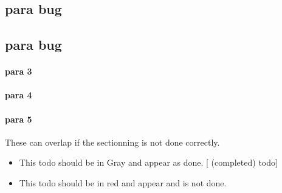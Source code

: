 \subsection{para bug}
\label{autosec:5}
\vspace{-36pt}\hspace{11pt}
\subsection{para bug}
\label{autosec:6}
\vspace{-36pt}\hspace{11pt}
\paragraph{para 3}
\label{autosec:7}
\paragraph{para 4}
\label{autosec:7}
\paragraph{para 5}
\label{autosec:7}
These can overlap if the sectionning is not done correctly.
    \begin{itemize}[noitemsep]
        \item {\color{Gray}This todo should be in Gray and appear as done. [ (completed) todo]}
        \item {\color{red}This todo should be in red and appear and is not done.}
    \end{itemize}
